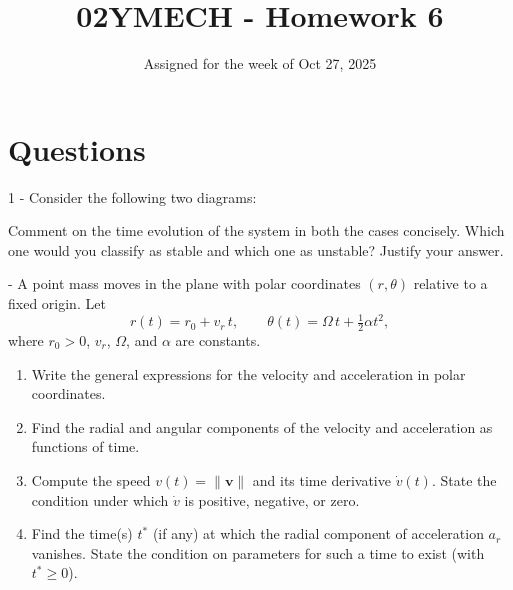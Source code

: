 \documentclass[12pt]{article}
\title{02YMECH - Homework 6}
\date{Assigned for the week of Oct 27, 2025}
\author{}
\begin{document}
\maketitle

\section*{Questions}
1 - Consider the following two diagrams:
\vspace{0.4cm}

\begin{minipage}{0.49\textwidth}
\centering
{}
\end{minipage}\hfill
\begin{minipage}{0.49\textwidth}
\centering
{}
\end{minipage}

\vspace{0.5cm}
\noindent
Comment on the time evolution of the system in both the cases concisely. Which one would you classify as stable and which one as unstable? Justify your answer.

\vspace{0.5cm}
- A point mass moves in the plane with polar coordinates $(r,\theta)$ relative to a fixed origin. Let
\[
r(t)=r_0+v_r\,t,\qquad \theta(t)=\Omega\,t+\tfrac{1}{2}\alpha t^2,
\]
where \(r_0>0\), \(v_r\), \(\Omega\), and \(\alpha\) are constants. 

\begin{enumerate}
  \item[(a)] Write the general expressions for the velocity and acceleration in polar coordinates.
  \item[(b)] Find the radial and angular components of the velocity and acceleration as functions of time.
  \item[(c)] Compute the speed \(v(t)=\|\mathbf v\|\) and its time derivative \(\dot v(t)\). State the condition under which \(\dot v\) is positive, negative, or zero.

  \item[(d)] Find the time(s) \(t^\ast\) (if any) at which the radial component of acceleration \(a_r\) vanishes. State the condition on parameters for such a time to exist (with \(t^\ast\ge 0\)).
\end{enumerate}
\end{document}
